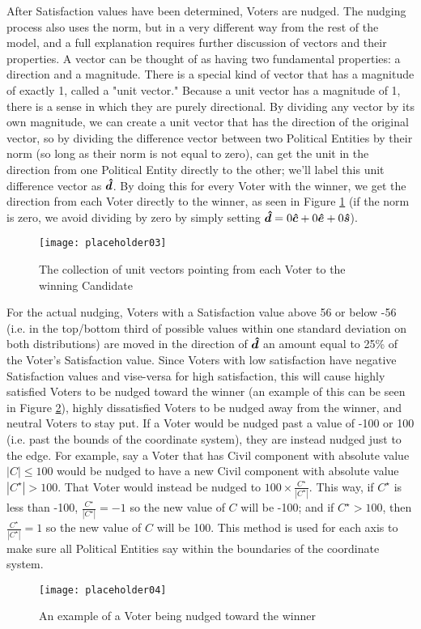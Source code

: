 \documentclass[12pt]{article}
\newcommand{\civ}{\vhat{c}}
\newcommand{\econ}{\vhat{e}}
\newcommand{\soc}{\vhat{s}}
\begin{document}
\qquad After Satisfaction values have been determined, Voters are nudged. The nudging process also uses the norm, but in a very different way from the rest of the model, and a full explanation requires further discussion of vectors and their properties. A vector can be thought of as having two fundamental properties: a direction and a magnitude. There is a special kind of vector that has a magnitude of exactly 1, called a "unit vector." Because a unit vector has a magnitude of 1, there is a sense in which they are purely directional. By dividing any vector by its own magnitude, we can create a unit vector that has the direction of the original vector, so by dividing the difference vector between two Political Entities by their norm (so long as their norm is not equal to zero), can get the unit in the direction from one Political Entity directly to the other; we'll label this unit difference vector as $\bm{\hat{d}}$. By doing this for every Voter with the winner, we get the direction from each Voter directly to the winner, as seen in Figure \ref{exUnitVectors} (if the norm is zero, we avoid dividing by zero by simply setting $\vhat{d} = 0\civ + 0\econ + 0\soc$).
\begin{figure}[H]
\centering
\texttt{[image: placeholder03]}
\caption{\footnotesize The collection of unit vectors pointing from each Voter to the winning Candidate}
\label{exUnitVectors}
\end{figure}

\qquad For the actual nudging, Voters with a Satisfaction value above 56 or below -56 (i.e. in the top/bottom third of possible values within one standard deviation on both distributions) are moved in the direction of $\bm{\hat{d}}$ an amount equal to 25\% of the Voter's Satisfaction value. Since Voters with low satisfaction have negative Satisfaction values and vise-versa for high satisfaction, this will cause highly satisfied Voters to be nudged toward the winner (an example of this can be seen in Figure \ref{exNudge}), highly dissatisfied Voters to be nudged away from the winner, and neutral Voters to stay put. If a Voter would be nudged past a value of -100 or 100 (i.e. past the bounds of the coordinate system), they are instead nudged just to the edge. For example, say a Voter that has Civil component with absolute value $\left|C\right| \le 100$ would be nudged to have a new Civil component with absolute value $\left|C^\star\right| > 100$. That Voter would instead be nudged to $100 \times \frac{C^\star}{\left|C^\star\right|}$. This way, if $C^\star$ is less than -100, $\frac{C^\star}{\left|C^\star\right|} = -1$ so the new value of $C$ will be -100; and if $C^\star > 100$, then $\frac{C^\star}{\left|C^\star\right|} = 1$ so the new value of $C$ will be 100. This method is used for each axis to make sure all Political Entities say within the boundaries of the coordinate system.
\begin{figure}[H]
\centering
\texttt{[image: placeholder04]}
\caption{\footnotesize An example of a Voter being nudged toward the winner}
\label{exNudge}
\end{figure}
\end{document}
